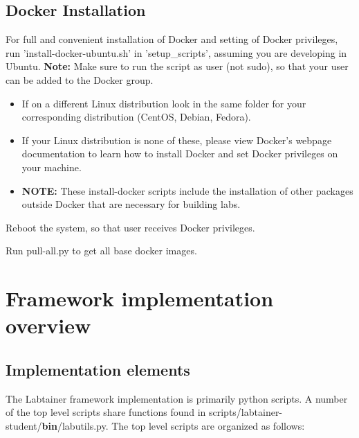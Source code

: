 \documentclass[12pt]{article}
\begin{document}
\subsection{Docker Installation}
\label{docker-install}
For full and convenient installation of Docker and setting of Docker privileges, run  'install-docker-ubuntu.sh' in 'setup\_scripts', assuming you are developing in Ubuntu. {\bf Note:} Make sure to run the script as user (not sudo), so that your user can be added to the Docker group.\\ 
    

    \begin {itemize}
    \item If on a different Linux distribution look in the same folder for your corresponding distribution (CentOS, Debian, Fedora). 
    \item If your Linux distribution is none of these, please view Docker's webpage documentation to learn how to install Docker and set Docker privileges on your machine.
    \item {\bf NOTE:} These install-docker scripts include the installation of other packages outside Docker that are necessary for building labs. 
    \end {itemize}

\noindent Reboot the system, so that user receives Docker privileges.

\noindent Run pull-all.py to get all base docker images.


\section {Framework implementation overview}
\subsection{Implementation elements}
The Labtainer framework implementation is primarily python scripts.  A number of the 
top level scripts share functions found in scripts/labtainer-student/{\bf bin}/labutils.py.  The 
top level scripts are organized as follows:
\end{document}
